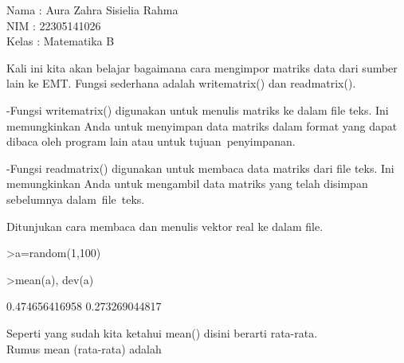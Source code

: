 \documentclass{article}
\begin{document}
\begin{eulernotebook}
\begin{eulercomment}
Nama  : Aura Zahra Sisielia Rahma\\
NIM   : 22305141026\\
Kelas : Matematika B

\begin{eulercomment}
\begin{eulercomment}
Kali ini kita akan belajar bagaimana cara mengimpor matriks data dari
sumber lain ke EMT. Fungsi sederhana adalah writematrix() dan
readmatrix().

-Fungsi writematrix() digunakan untuk menulis matriks ke dalam file
teks. Ini memungkinkan Anda untuk menyimpan data matriks dalam format
yang dapat dibaca oleh program lain atau untuk tujuan penyimpanan.

-Fungsi readmatrix() digunakan untuk membaca data matriks dari file
teks. Ini memungkinkan Anda untuk mengambil data matriks yang telah
disimpan sebelumnya dalam file teks.


Ditunjukan cara membaca dan menulis vektor real ke dalam file.
\end{eulercomment}
\begin{eulerprompt}
>a=random(1,100)
\end{eulerprompt}
\begin{euleroutput}
  [0.655416,  0.200995,  0.893622,  0.281887,  0.525,  0.314127,
  0.444616,  0.299474,  0.28269,  0.883227,  0.270906,  0.704419,
  0.217693,  0.445363,  0.308411,  0.914541,  0.193585,  0.463387,
  0.095153,  0.595017,  0.431184,  0.72868,  0.465164,  0.323032,
  0.525184,  0.502255,  0.168603,  0.262253,  0.866587,  0.536137,
  0.493453,  0.601344,  0.659461,  0.967468,  0.193151,  0.935921,
  0.0728753,  0.988966,  0.0104376,  0.356626,  0.52143,  0.428893,
  0.168134,  0.182742,  0.288048,  0.750042,  0.472935,  0.324407,
  0.340388,  0.195494,  0.44607,  0.216545,  0.598477,  0.729271,
  0.950019,  0.791698,  0.418637,  0.469159,  0.898763,  0.388543,
  0.674114,  0.0752676,  0.854693,  0.123222,  0.205006,  0.465049,
  0.0281269,  0.60809,  0.10999,  0.615836,  0.217391,  0.962872,
  0.842267,  0.328758,  0.561146,  0.918802,  0.997492,  0.473212,
  0.185709,  0.421585,  0.720843,  0.247804,  0.834083,  0.44372,
  0.371866,  0.775718,  0.37468,  0.224336,  0.0102885,  0.164816,
  0.356866,  0.408866,  0.350091,  0.347412,  0.161257,  0.588325,
  0.83884,  0.906718,  0.916402,  0.0960726]
\end{euleroutput}
\begin{eulerprompt}
>mean(a), dev(a)
\end{eulerprompt}
\begin{euleroutput}
  0.474656416958
  0.273269044817
\end{euleroutput}
\begin{eulercomment}
Seperti yang sudah kita ketahui mean() disini berarti rata-rata.\\
Rumus mean (rata-rata) adalah


\end{eulercomment}
\end{eulercomment}
\end{eulercomment}
\end{eulernotebook}
\end{document}
